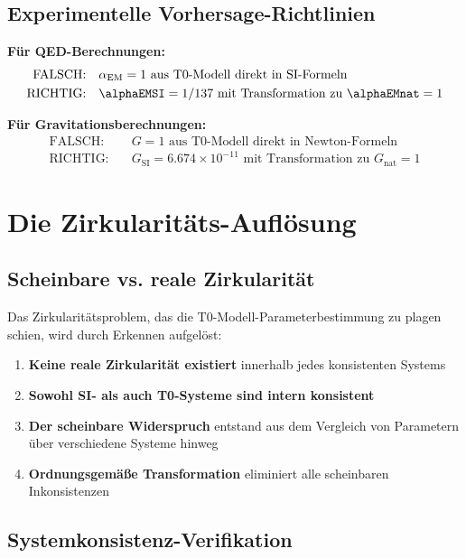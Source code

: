 	\subsection{Experimentelle Vorhersage-Richtlinien}
	\label{subsec:experimentelle_richtlinien}
	
	\textbf{Für QED-Berechnungen:}
	\begin{align}
		\text{FALSCH:} \quad &\alpha_{\text{EM}} = 1 \text{ aus T0-Modell direkt in SI-Formeln} \\
		\text{RICHTIG:} \quad &\alphaEMSI = 1/137 \text{ mit Transformation zu } \alphaEMnat = 1
	\end{align}
	
	\textbf{Für Gravitationsberechnungen:}
	\begin{align}
		\text{FALSCH:} \quad &G = 1 \text{ aus T0-Modell direkt in Newton-Formeln} \\
		\text{RICHTIG:} \quad &G_{\text{SI}} = 6.674 \times 10^{-11} \text{ mit Transformation zu } G_{\text{nat}} = 1
	\end{align}
	
	\section{Die Zirkularitäts-Auflösung}
	\label{sec:zirkularitaets_aufloesung}
	
	\subsection{Scheinbare vs. reale Zirkularität}
	\label{subsec:scheinbare_reale_zirkularitaet}
	
	Das Zirkularitätsproblem, das die T0-Modell-Parameterbestimmung zu plagen schien, wird durch Erkennen aufgelöst:
	
	\begin{enumerate}
		\item \textbf{Keine reale Zirkularität existiert} innerhalb jedes konsistenten Systems
		\item \textbf{Sowohl SI- als auch T0-Systeme sind intern konsistent}
		\item \textbf{Der scheinbare Widerspruch} entstand aus dem Vergleich von Parametern über verschiedene Systeme hinweg
		\item \textbf{Ordnungsgemäße Transformation} eliminiert alle scheinbaren Inkonsistenzen
	\end{enumerate}
	
	\subsection{Systemkonsistenz-Verifikation}
	\label{subsec:systemkonsistenz}
	
